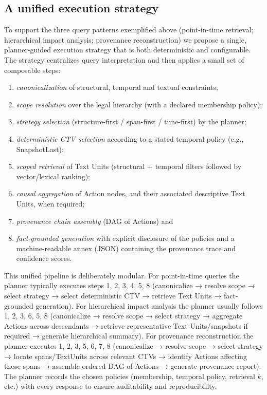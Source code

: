 \documentclass[11pt]{article}
\begin{document}
\subsection{A unified execution strategy}
\label{sec:unified_strategy}
To support the three query patterns exemplified above (point-in-time retrieval; hierarchical impact analysis; provenance reconstruction) we propose a single, planner-guided execution strategy that is both deterministic and configurable. The strategy centralizes query interpretation and then applies a small set of composable steps:
\begin{enumerate}
    \item \emph{canonicalization} of structural, temporal and textual constraints; 
    \item \emph{scope resolution} over the legal hierarchy (with a declared membership policy); 
    \item \emph{strategy selection} (structure-first / span-first / time-first) by the planner; 
    \item \emph{deterministic CTV selection} according to a stated temporal policy (e.g., SnapshotLast); 
    \item \emph{scoped retrieval} of Text Units (structural + temporal filters followed by vector/lexical ranking); 
    \item \emph{causal aggregation} of Action nodes, and their associated descriptive Text Units, when required; \item \emph{provenance chain assembly} (DAG of Actions) and 
    \item \emph{fact-grounded generation} with explicit disclosure of the policies and a machine-readable annex (JSON) containing the provenance trace and confidence scores.
\end{enumerate}

This unified pipeline is deliberately modular. For point-in-time queries the planner typically executes steps 1, 2, 3, 4, 5, 8 (canonicalize → resolve scope → select strategy → select deterministic CTV → retrieve Text Units → fact-grounded generation). For hierarchical impact analysis the planner usually follows 1, 2, 3, 6, 5, 8 (canonicalize → resolve scope → select strategy → aggregate Actions across descendants → retrieve representative Text Units/snapshots if required → generate hierarchical summary). For provenance reconstruction the planner executes 1, 2, 3, 5, 6, 7, 8 (canonicalize → resolve scope → select strategy → locate spans/TextUnits across relevant CTVs → identify Actions affecting those spans → assemble ordered DAG of Actions → generate provenance report). The planner records the chosen policies (membership, temporal policy, retrieval $k$, etc.) with every response to ensure auditability and reproducibility.
\end{document}
